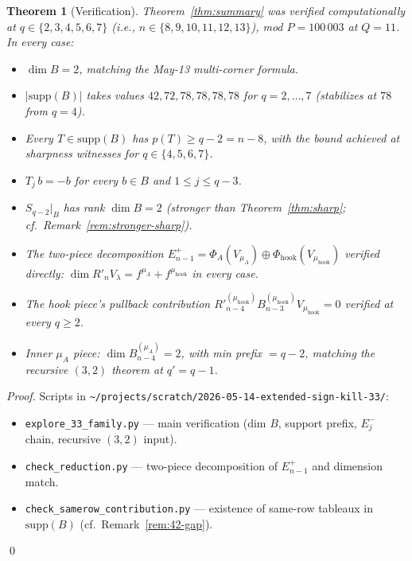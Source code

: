 \documentclass[11pt]{article}
\newtheorem{theorem}{Theorem}
\theoremstyle{definition}
\newcommand{\supp}{\mathrm{supp}}
\newcommand{\Rp}{{R'}}
\begin{document}
\begin{theorem}[Verification]\label{thm:verify}
Theorem~\ref{thm:summary} was verified computationally at $q \in
\{2, 3, 4, 5, 6, 7\}$ (i.e., $n \in \{8, 9, 10, 11, 12, 13\}$),
mod $P = 100\,003$ at $Q = 11$.  In every case:
\begin{itemize}[topsep=0.3em,itemsep=0.1em]
\item $\dim B = 2$, matching the May-13 multi-corner formula.
\item $|\supp(B)|$ takes values $42, 72, 78, 78, 78, 78$ for $q = 2,
   \ldots, 7$ (stabilizes at $78$ from $q = 4$).
\item Every $T \in \supp(B)$ has $p(T) \ge q - 2 = n - 8$, with the
   bound achieved at sharpness witnesses for $q \in \{4, 5, 6, 7\}$.
\item $T_j\,b = -b$ for every $b \in B$ and $1 \le j \le q - 3$.
\item $S_{q-2}|_B$ has rank $\dim B = 2$ (stronger than
   Theorem~\ref{thm:sharp}; cf.\ Remark~\ref{rem:stronger-sharp}).
\item The two-piece decomposition $E_{n-1}^+ = \Phi_A(V_{\mu_A}) \oplus
   \Phi_{\mathrm{hook}}(V_{\mu_{\mathrm{hook}}})$ verified directly:
   $\dim R'_n V_\lambda = f^{\mu_A} + f^{\mu_{\mathrm{hook}}}$
   in every case.
\item The hook piece's pullback contribution
   $\Rp^{(\mu_{\mathrm{hook}})}_{n-4} B^{(\mu_{\mathrm{hook}})}_{n-3} V_{\mu_{\mathrm{hook}}} = 0$
   verified at every $q \ge 2$.
\item Inner $\mu_A$ piece: $\dim B^{(\mu_A)}_{n-4} = 2$, with min
   prefix $= q - 2$, matching the recursive $(3, 2)$ theorem at $q' =
   q - 1$.
\end{itemize}
\end{theorem}

\begin{proof}
Scripts in \texttt{\textasciitilde/projects/scratch/2026-05-14-extended-sign-kill-33/}:
\begin{itemize}[topsep=0.3em,itemsep=0.1em,leftmargin=2em]
\item \texttt{explore\_33\_family.py} --- main verification (dim $B$,
   support prefix, $E_j^-$ chain, recursive $(3, 2)$ input).
\item \texttt{check\_reduction.py} --- two-piece decomposition of
   $E_{n-1}^+$ and dimension match.
\item \texttt{check\_samerow\_contribution.py} --- existence of
   same-row tableaux in $\supp(B)$ (cf.\ Remark~\ref{rem:42-gap}).
\end{itemize}
\qed
\end{proof}
\end{document}
